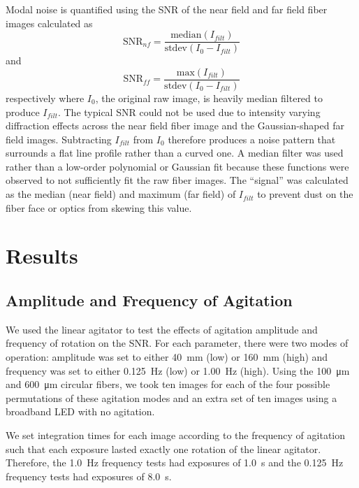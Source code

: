 \documentclass[twocolumn]{emulateapj}
\begin{document}
Modal noise is quantified using the SNR of the near field and far field fiber images calculated as
\begin{equation}
\textrm{SNR}_{nf} = \frac{\textrm{median}(I_{filt})}{\textrm{stdev}(I_0 - I_{filt})}
\end{equation}
and
\begin{equation}
\textrm{SNR}_{ff} = \frac{\textrm{max}(I_{filt})}{\textrm{stdev}(I_0 - I_{filt})}
\end{equation}
respectively where $I_0$, the original raw image, is heavily median filtered to produce $I_{filt}$. The typical SNR could not be used due to intensity varying diffraction effects across the near field fiber image and the Gaussian-shaped far field images. Subtracting $I_{filt}$ from $I_0$ therefore produces a noise pattern that surrounds a flat line profile rather than a curved one. A median filter was used rather than a low-order polynomial or Gaussian fit because these functions were observed to not sufficiently fit the raw fiber images. The ``signal'' was calculated as the median (near field) and maximum (far field) of $I_{filt}$ to prevent dust on the fiber face or optics from skewing this value.

\section{Results}
\label{sec:results}

\subsection{Amplitude and Frequency of Agitation}
\label{subsec:amp_freq}

We used the linear agitator to test the effects of agitation amplitude and frequency of rotation on the SNR. For each parameter, there were two modes of operation: amplitude was set to either \SI{40}{\milli\meter} (low) or \SI{160}{\milli\meter} (high) and frequency was set to either \SI{0.125}{\hertz} (low) or \SI{1.00}{\hertz} (high). Using the \SI{100}{\micro\meter} and \SI{600}{\micro\meter} circular fibers, we took ten images for each of the four possible permutations of these agitation modes and an extra set of ten images using a broadband LED with no agitation.

We set integration times for each image according to the frequency of agitation such that each exposure lasted exactly one rotation of the linear agitator. Therefore, the \SI{1.0}{\hertz} frequency tests had exposures of \SI{1.0}{\second} and the \SI{0.125}{\hertz} frequency tests had exposures of \SI{8.0}{\second}.
\end{document}

